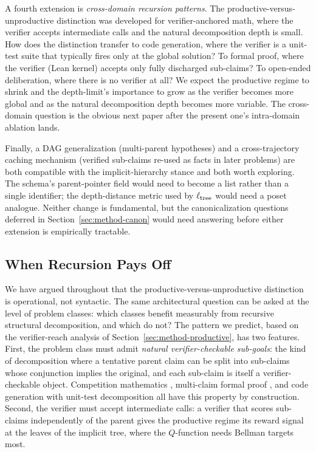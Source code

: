 A fourth extension is \emph{cross-domain recursion patterns}. The
productive-versus-unproductive distinction was developed for
verifier-anchored math, where the verifier accepts intermediate calls and
the natural decomposition depth is small. How does the distinction
transfer to code generation, where the verifier is a unit-test suite that
typically fires only at the global solution? To formal proof, where the
verifier (Lean kernel) accepts only fully discharged sub-claims? To
open-ended deliberation, where there is no verifier at all? We expect
the productive regime to shrink and the depth-limit's importance to grow
as the verifier becomes more global and as the natural decomposition
depth becomes more variable. The cross-domain question is the obvious
next paper after the present one's intra-domain ablation lands.

Finally, a DAG generalization (multi-parent hypotheses) and a cross-trajectory
caching mechanism (verified sub-claims re-used as facts in later problems)
are both compatible with the implicit-hierarchy stance and both worth
exploring. The schema's parent-pointer field would need to become a list
rather than a single identifier; the depth-distance metric used by
$\ell_{\mathrm{tree}}$ would need a poset analogue. Neither change is fundamental,
but the canonicalization questions deferred in
Section~\ref{sec:method-canon} would need answering before either
extension is empirically tractable.

\subsection{When Recursion Pays Off}
\label{sec:disc-when}

We have argued throughout that the productive-versus-unproductive
distinction is operational, not syntactic. The same architectural
question can be asked at the level of problem classes: which classes
benefit measurably from recursive structural decomposition, and which do
not? The pattern we predict, based on the verifier-reach analysis of
Section~\ref{sec:method-productive}, has two features. First, the
problem class must admit \emph{natural verifier-checkable sub-goals}:
the kind of decomposition where a tentative parent claim can be split
into sub-claims whose conjunction implies the original, and each
sub-claim is itself a verifier-checkable object. Competition mathematics
\citep{hendrycks2021math}, multi-claim formal proof \citep{deepmind2024alphaproof,
yang2023leandojo}, and code generation with unit-test decomposition
\citep{li2022alphacode} all have this property by construction. Second,
the verifier must accept intermediate calls: a verifier that scores
sub-claims independently of the parent gives the productive regime its
reward signal at the leaves of the implicit tree, where the $Q$-function
needs Bellman targets most.

